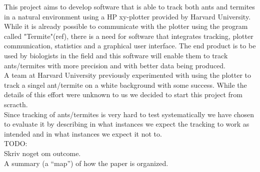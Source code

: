 This project aims to develop software that is able to track both ants and termites in a natural environment using a HP xy-plotter provided by Harvard University. While it is already possible to communicate with the plotter using the program called "Termite"(ref), there is a need for software that integrates tracking, plotter communication, statistics and a graphical user interface. The end product is to be used by biologists in the field and this software will enable them to track ants/termites with more precision and with better data being produced.\\

A team at Harvard University previously experimented with using the plotter to track a singel ant/termite on a white background with some success. While the details of this effort were unknown to us we decided to start this project from scracth. \\

Since tracking of ants/termites is very hard to test systematically we have chosen to evaluate it by describing in what instances we expect the tracking to work as intended and in what instances we expect it not to. \\

TODO: \\
Skriv noget om outcome. \\
A summary (a “map”) of how the paper is organized.\\



